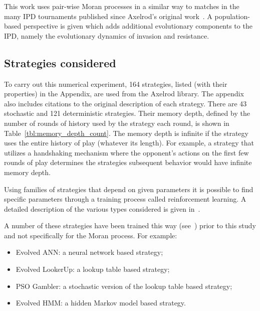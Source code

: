 \documentclass[10pt,letterpaper]{article}
\begin{document}
This work uses pair-wise Moran processes in a similar way to matches in the many
IPD tournaments published since Axelrod's original work~\cite{Axelrod1980a}.
A population-based perspective is given which adds additional
evolutionary components to the IPD, namely the evolutionary dynamics of invasion
and resistance.

\subsection*{Strategies considered}\label{sec:strategies}

To carry out this numerical experiment, 164
strategies, listed (with their properties) in the Appendix,
are used from the Axelrod library. The appendix also includes citations to the
original description of each strategy. There are
43 stochastic and
121 deterministic strategies. Their memory depth,
defined by the number of rounds of history used by the strategy each round, is
shown in Table~\ref{tbl:memory_depth_count}. The memory depth is infinite if the
strategy uses the entire history of play (whatever its length). For example, a
strategy that utilizes a handshaking mechanism where the opponent's actions on
the first few rounds of play determines the strategies subsequent behavior would
have infinite memory depth.

Using families of strategies that depend on given parameters it is possible to
find specific parameters through a training process called reinforcement
learning. A detailed description of the various types considered is given
in~\cite{Harper2017}.

A number of these strategies have been trained this way (see~\cite{Harper2017})
prior to this study and not specifically for the Moran process. For example:

\begin{itemize}
    \item Evolved ANN: a neural network based strategy;
    \item Evolved LookerUp: a lookup table based strategy;
    \item PSO Gambler: a stochastic version of the lookup table based strategy;
    \item Evolved HMM: a hidden Markov model based strategy.
\end{itemize}
\end{document}
